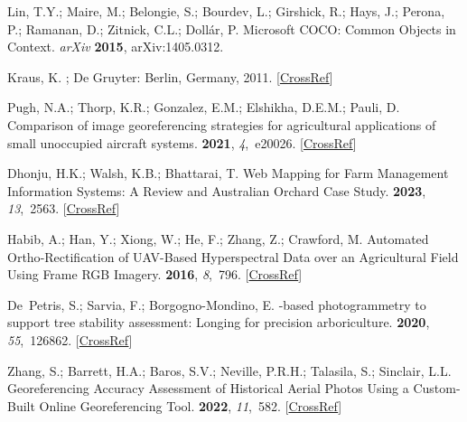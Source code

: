 \documentclass[12pt,a4paper,oneside]{report}
\begin{document}
\begin{thebibliography}{999}
Lin, T.Y.; Maire, M.; Belongie, S.; Bourdev, L.; Girshick, R.; Hays, J.;
Perona, P.; Ramanan, D.; Zitnick, C.L.; Doll{\'a}r, P.
\newblock Microsoft {{COCO}}: {{Common Objects}} in {{Context}}. {\em arXiv} {\bf 2015}, arXiv:1405.0312.

Kraus, K.
; De Gruyter: Berlin, Germany, 2011. [\href{http://dx.doi.org/10.1515/9783110892871}{CrossRef}]

Pugh, N.A.; Thorp, K.R.; Gonzalez, E.M.; Elshikha, D.E.M.; Pauli, D.
\newblock Comparison of image georeferencing strategies for agricultural
applications of small unoccupied aircraft systems.
 {\bf 2021}, {\em 4},~e20026. [\href{http://dx.doi.org/10.1002/ppj2.20026}{CrossRef}]

Dhonju, H.K.; Walsh, K.B.; Bhattarai, T.
\newblock Web {Mapping} for {Farm} {Management} {Information} {Systems}: {A}
{Review} and {Australian} {Orchard} {Case} {Study}.
 {\bf 2023}, {\em 13},~2563. [\href{http://dx.doi.org/10.3390/agronomy13102563}{CrossRef}]

Habib, A.; Han, Y.; Xiong, W.; He, F.; Zhang, Z.; Crawford, M.
\newblock Automated {Ortho}-{Rectification} of {UAV}-{Based} {Hyperspectral}
{Data} over an {Agricultural} {Field} {Using} {Frame} {RGB} {Imagery}.
 {\bf 2016}, {\em 8},~796. [\href{http://dx.doi.org/10.3390/rs8100796}{CrossRef}]

De~Petris, S.; Sarvia, F.; Borgogno-Mondino, E.
-based photogrammetry to support tree stability assessment:
{Longing} for precision arboriculture.
 {\bf 2020}, {\em 55},~126862. [\href{http://dx.doi.org/10.1016/j.ufug.2020.126862}{CrossRef}]

Zhang, S.; Barrett, H.A.; Baros, S.V.; Neville, P.R.H.; Talasila, S.; Sinclair,
L.L.
\newblock Georeferencing {Accuracy} {Assessment} of {Historical} {Aerial}
{Photos} {Using} a {Custom}-{Built} {Online} {Georeferencing} {Tool}.
 {\bf 2022}, {\em
11},~582. [\href{http://dx.doi.org/10.3390/ijgi11120582}{CrossRef}]


\end{thebibliography}
\end{document}
